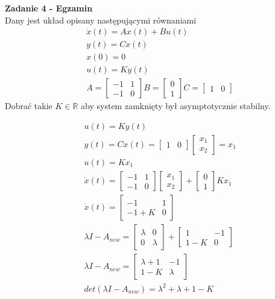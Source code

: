 \documentclass[a4paper,11pt]{article}
\begin{document}
\newpage
\begin{framed}
\textbf{Zadanie 4 - Egzamin } \\ 
Dany jest układ opisany następującymi równaniami 
\begin{align*}
&\dot{x}(t)=Ax(t)+Bu(t) \\
&y(t)=Cx(t) \\
&x(0)=0 \\
&u(t)=Ky(t) \\
&A =
\begin{bmatrix}
-1 & 1 \\
-1 & 0 
\end{bmatrix}
B = 
\begin{bmatrix}
0 \\
1
\end{bmatrix}
C =
\begin{bmatrix}
1 & 0
\end{bmatrix} 
\end{align*}
Dobrać takie \( K \in \mathbb{R} \) aby system zamknięty był asymptotycznie stabilny.
\end{framed}
\begin{align*}
&u(t)=Ky(t) \\
&y(t) = Cx(t) = 
\begin{bmatrix}
1 & 0 
\end{bmatrix}
\begin{bmatrix}
x_{1} \\
x_{2}
\end{bmatrix}=
x_{1} \\
&u(t)=Kx_1 \\
&\dot{x}(t)=
\begin{bmatrix}
-1 & 1 \\
-1 & 0 
\end{bmatrix}
\begin{bmatrix}
x_1 \\
x_2
\end{bmatrix}
+
\begin{bmatrix}
0 \\
1
\end{bmatrix}
Kx_1 \\
&\dot{x}(t) = 
\begin{bmatrix}
-1 & 1 \\
-1 + K & 0
\end{bmatrix} \\
& \lambda I - A_{new} = 
\begin{bmatrix}
\lambda & 0 \\
0 & \lambda
\end{bmatrix} +
\begin{bmatrix}
1 & -1 \\
1-K & 0
\end{bmatrix}\\
&\lambda I - A_{new} = 
\begin{bmatrix}
\lambda + 1 & -1 \\
1 - K & \lambda
\end{bmatrix} \\
&det( \lambda I - A_{new} ) = \lambda ^{2} + \lambda + 1 - K
\end{align*}
\end{document}
